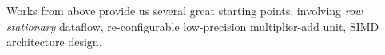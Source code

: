 Works from above provide us several great starting points, involving \textit{row stationary} dataflow, re-configurable low-precision multiplier-add unit, SIMD architecture design. 


